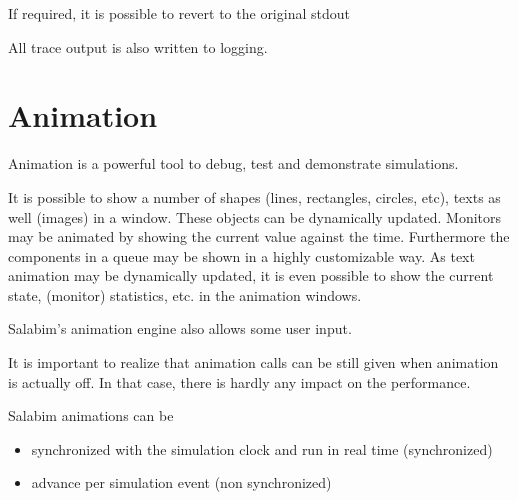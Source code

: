 \documentclass[letterpaper,10pt,english]{sphinxmanual}
\begin{document}
\begin{sphinxVerbatim}[commandchars=\\\{\}]
  
   
\end{sphinxVerbatim}

If required, it is possible to revert to the original stdout

\begin{sphinxVerbatim}[commandchars=\\\{\}]
  
\end{sphinxVerbatim}

All trace output is also written to logging.


\chapter{Animation}
\label{\detokenize{Animation::doc}}\label{\detokenize{Animation:animation}}
Animation is a powerful tool to debug, test and demonstrate simulations.

It is possible to show a number of shapes (lines, rectangles, circles, etc), texts as well (images) in a window. These objects can be dynamically updated.
Monitors may be animated by showing the current value against the time.
Furthermore the components in a queue may be shown in a highly customizable way.
As text animation may be dynamically updated, it is even possible to show the current state, (monitor) statistics, etc. in the animation windows.

Salabim’s animation engine also allows some user input.

It is important to realize that animation calls can be still given when animation is actually off. In that case, there is hardly any impact on the performance.

Salabim animations can be
\begin{itemize}
\item {} 
synchronized with the simulation clock and run in real time (synchronized)

\item {} 
advance per simulation event (non synchronized)

\end{itemize}
\end{document}

